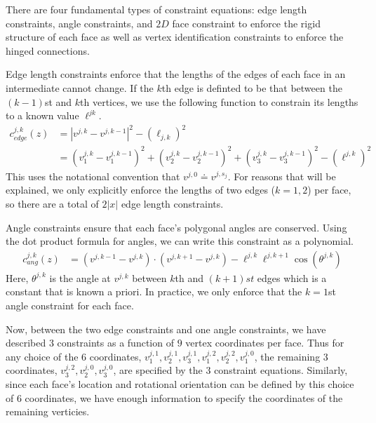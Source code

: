 There are four fundamental types of constraint equations: edge length constraints, angle constraints, and $2D$ face constraint to enforce the rigid structure of each face as well as vertex identification constraints to enforce the hinged connections.

Edge length constraints enforce that the lengths of the edges of each face in an intermediate cannot change. If the $k$th edge is definted to be that between the $(k-1)$st and $k$th vertices, we use the following function to constrain its lengths to a known value $\ell^{jk}$.
\begin{align}
c_{edge}^{j,k}\left(z\right)& = \left|v^{j,k} - v^{j,k-1}\right|^2 - (\ell_{j,k})^2 \\
& = \left(v_1^{j,k} - v_1^{j,k-1}\right)^2 +\left(v_2^{j,k} - v_2^{j,k-1}\right)^2 +\left(v_3^{j,k} - v_3^{j,k-1}\right)^2 - (\ell^{j,k})^2 
\end{align}  
This uses the notational convention that $v^{j,0} \doteq v^{j,s_j}$. For reasons that will be explained, we only explicitly enforce the lengths of two edges ($k=1,2$) per face, so there are a total of $2|x|$ edge length constraints. 

Angle constraints ensure that each face's polygonal angles are conserved. Using the dot product formula for angles, we can write this constraint as a polynomial.
\begin{align}
c_{ang}^{j,k}\left(z\right) &= (v^{j,k-1} - v^{j,k})\cdot(v^{j,k+1} - v^{j,k})  - \ell^{j,k}\ell^{j,k+1}\cos(\theta^{j,k})
\end{align}  
Here, $\theta^{j,k}$ is the angle at $v^{j,k}$ between $k$th and $(k+1)st$ edges which is a constant that is known a priori. In practice, we only enforce that the $k=1$st angle constraint for each face.

Now, between the two edge constraints and one angle constraints, we have described $3$ constraints as a function of $9$ vertex coordinates per face. Thus for any choice of the $6$ coordinates, $v^{j,1}_1, v^{j,1}_2, v^{j,1}_3, v^{j,2}_1, v^{j,2}_2, v^{j,0}_1$, the remaining $3$ coordinates, $v^{j,2}_3, v^{j,0}_2, v^{j,0}_3$, are specified by the $3$ constraint equations. Similarly, since each face's location and rotational orientation can be defined by this choice of $6$ coordinates, we have enough information to specify the coordinates of the remaining verticies. 

